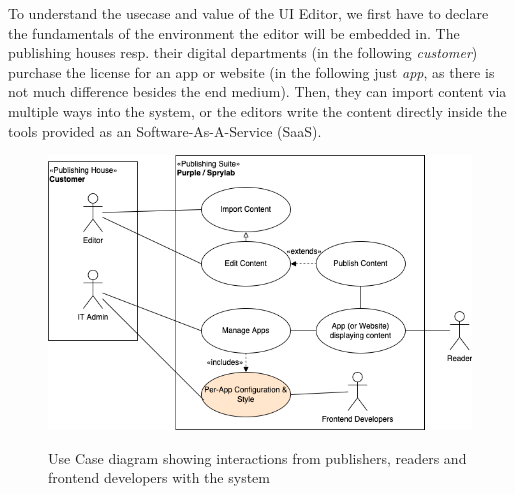 To understand the usecase and value of the UI Editor, we first have to declare the fundamentals of the environment the editor will be embedded in.
The publishing houses resp. their digital departments (in the following \textit{customer}) purchase the license for an app or website (in the following just \textit{app}, as there is not much difference besides the end medium).
Then, they can import content via multiple ways into the system, or the editors write the content directly inside the tools provided as an Software-As-A-Service (SaaS).

\begin{figure}[h]
  \caption{Use Case diagram showing interactions from publishers, readers and frontend developers with the system}
  \includegraphics[width=\textwidth]{pics/purple-abstract.drawio.png}
  \label{fig:usecase1}
\end{figure}

